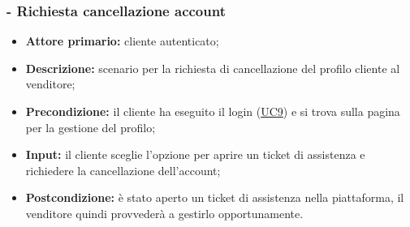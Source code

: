 \stepsubUserCase
\subsubsection{ - Richiesta cancellazione account}
\begin{itemize}
    \item \textbf{Attore primario:} cliente autenticato;
    \item \textbf{Descrizione:} scenario per la richiesta di cancellazione del profilo cliente al venditore;
    \item \textbf{Precondizione:} il cliente ha eseguito il login (\hyperref[UC9]{UC9}) e si trova sulla pagina per la gestione del profilo;
    \item \textbf{Input:} il cliente sceglie l'opzione per aprire un ticket di assistenza e richiedere la cancellazione dell'account;
    \item \textbf{Postcondizione:} è stato aperto un ticket di assistenza nella piattaforma, il venditore quindi provvederà a gestirlo opportunamente.
\end{itemize}

\stepsubUserCase
